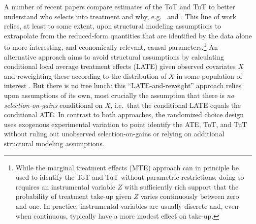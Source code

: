 \documentclass[oneside,11pt]{article}
\begin{document}
{A number of recent papers compare estimates of the ToT and TuT to better understand who selects into treatment and why, e.g.\ \cite{cornelissen2018benefits} and \cite{Walters}. 
This line of work relies, at least to some extent, upon structural modeling assumptions to extrapolate from the reduced-form quantities that are identified by the data alone to more interesting, and economically relevant, causal parameters.\footnote{While the marginal treatment effects (MTE) approach \citep{heckman2007econometric} can in principle be used to identify the ToT and TuT without parametric restrictions, doing so requires an instrumental variable $Z$ with sufficiently rich support that the probability of treatment take-up given $Z$ varies continuously between zero and one. In practice, instrumental variables are usually discrete and, even when continuous, typically have a more modest effect on take-up.} 
An alternative approach aims to avoid structural assumptions by calculating conditional local average treatment effects (LATE) given observed covariates $X$ and reweighting these according to the distribution of $X$ in some population of interest \citep{aronow2013beyond,angrist2013extrapolate}. 
But there is no free lunch: this ``LATE-and-reweight'' approach relies upon assumptions of its own, most crucially the assumption that there is \emph{no selection-on-gains} conditional on $X$, i.e.\ that the conditional LATE equals the conditional ATE. 
In contrast to both approaches, the randomized choice design uses exogenous experimental variation to point identify the ATE, ToT, and TuT without ruling out unobserved selection-on-gains or relying on additional structural modeling assumptions.

}
\end{document}
